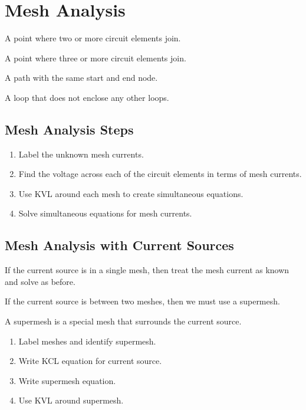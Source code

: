 \documentclass{article}
\begin{document}
\section{Mesh Analysis}
\begin{definition}[Node]
    A point where two or more circuit elements join.
\end{definition}
\begin{definition}
    A point where three or more circuit elements join.
\end{definition}
\begin{definition}[Loop]
    A path with the same start and end node.
\end{definition}
\begin{definition}[Mesh]
    A loop that does not enclose any other loops.
\end{definition}
\subsection{Mesh Analysis Steps}
\begin{enumerate}
    \item Label the unknown mesh currents.
    \item Find the voltage across each of the circuit elements in terms of mesh currents.
    \item Use KVL around each mesh to create simultaneous equations.
    \item Solve simultaneous equations for mesh currents.
\end{enumerate}
\subsection{Mesh Analysis with Current Sources}
If the current source is in a single mesh, then treat the mesh current as known and solve as before.

If the current source is between two meshes, then we must use a supermesh.
\begin{definition}[Supermesh]
    A supermesh is a special mesh that surrounds the current source.
\end{definition}
\begin{enumerate}
    \item Label meshes and identify supermesh.
    \item Write KCL equation for current source.
    \item Write supermesh equation.
    \item Use KVL around supermesh.
\end{enumerate}
\newpage
\end{document}
